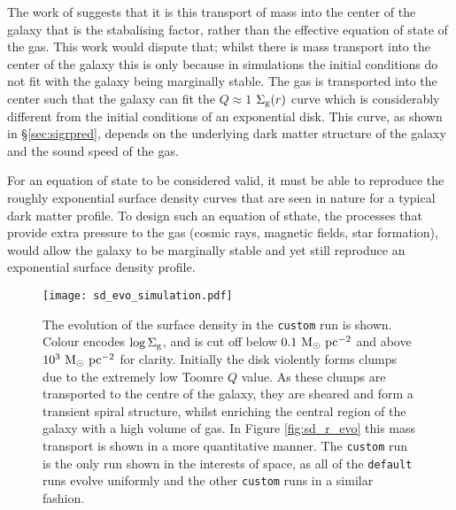 The work of \citet{krumholz_is_2016} suggests that it is this transport of mass into the center of the galaxy that is the stabalising factor, rather than the effective equation of state of the gas.
This work would dispute that; whilst there is mass transport into the center of the galaxy this is only because in simulations the initial conditions do not fit with the galaxy being marginally stable.
The gas is transported into the center such that the galaxy can fit the $Q\approx1$ $\Sigma_\mathrm{g}(r)$ curve which is considerably different from the initial conditions of an exponential disk.
This curve, as shown in \S \ref{sec:sigrpred}, depends on the underlying dark matter structure of the galaxy and the sound speed of the gas.

For an equation of state to be considered valid, it must be able to reproduce the roughly exponential surface density curves that are seen in nature for a typical dark matter profile.
To design such an equation of sthate, the processes that provide extra pressure to the gas (cosmic rays, magnetic fields, star formation), would allow the galaxy to be marginally stable and yet still reproduce an exponential surface density profile.

\begin{figure}[!ht]
    \texttt{[image: sd\_evo\_simulation.pdf]}
    \caption{The evolution of the surface density in the {\tt custom} run is shown. Colour encodes $\log\Sigma_\mathrm{g}$, and is cut off below $0.1 ~\mathrm{M}_{\odot} ~\mathrm{pc}^{-2}$ and above $10^3 ~\mathrm{M}_{\odot} ~\mathrm{pc}^{-2}$ for clarity. Initially the disk violently forms clumps due to the extremely low Toomre $Q$ value. As these clumps are transported to the centre of the galaxy, they are sheared and form a transient spiral structure, whilst enriching the central region of the galaxy with a high volume of gas. In Figure \ref{fig:sd_r_evo} this mass transport is shown in a more quantitative manner. The {\tt custom} run is the only run shown in the interests of space, as all of the {\tt default} runs evolve uniformly and the other {\tt custom} runs in a similar fashion.}
    \label{fig:sd_evo_small}
\end{figure}

